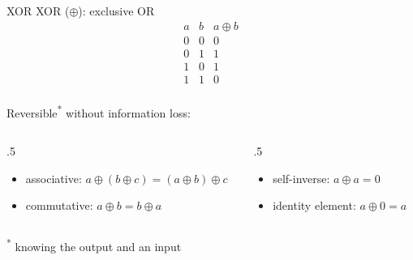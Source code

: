 \begin{frame}{XOR}
  \pause
  XOR ($\oplus$): exclusive OR
  \pause
  \begin{displaymath}
    \begin{array}{|c|c|c|}
      a & b & a \oplus b\\
      \hline
      0 & 0 & 0\\
      0 & 1 & 1\\
      1 & 0 & 1\\
      1 & 1 & 0\\
    \end{array}
  \end{displaymath}

  \pause
  Reversible\textsuperscript{*} without information loss:
  \begin{columns}[T]
    \begin{column}{.5\textwidth}
      \begin{itemize}[<+(1)->]
        \item associative: $a \oplus (b \oplus c) = (a \oplus b) \oplus c$
        \item commutative: $a \oplus b = b \oplus a$
      \end{itemize}
    \end{column}
    \begin{column}{.5\textwidth}
      \begin{itemize}[<+(1)->]
        \item self-inverse: $a \oplus a = 0$
        \item identity element: $a \oplus 0 = a$
      \end{itemize}
    \end{column}
  \end{columns}

  \vspace*{1em}

  {\scriptsize \textsuperscript{*} knowing the output and an input}
\end{frame}

